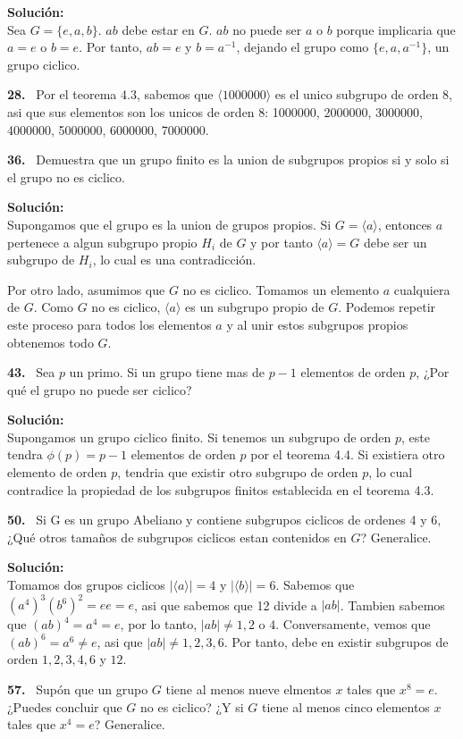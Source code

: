 \documentclass{article}
\newcounter{problem}
\newcounter{solution}
\newcommand\Problem[1]{%
  \stepcounter{problem}%
  \textbf{#1.}~%
  \setcounter{solution}{0}%
}
\newcommand\TheSolution{%
  \textbf{Solución:}\\%
}
\begin{document}
\TheSolution{}
Sea $G = \{e, a, b\}$. $ab$ debe estar en $G$. $ab$ no puede ser $a$ o $b$
porque implicaria que $a = e$ o $b = e$. Por tanto, $ab = e$ y $b = a^{-1}$,
dejando el grupo como $\{e, a, a^{-1}\}$, un grupo ciclico.

\Problem{28} Por el teorema 4.3, sabemos que $\langle 1000000\rangle$ es el
unico subgrupo de orden 8, asi que sus elementos son los unicos de orden 8:
1000000, 2000000, 3000000, 4000000, 5000000, 6000000, 7000000.

\Problem{36} Demuestra que un grupo finito es la union de subgrupos propios si
y solo si el grupo no es ciclico.

\TheSolution{}
Supongamos que el grupo es la union de grupos propios. Si $G = \langle 
a\rangle$, entonces $a$ pertenece a algun subgrupo propio $H_i$ de $G$ y
por tanto $\langle a \rangle = G$ debe ser un subgrupo de $H_i$, lo cual es
una contradicción.

Por otro lado, asumimos que $G$ no es ciclico. Tomamos un elemento $a$
cualquiera de $G$. Como $G$ no es ciclico, $\langle a \rangle$ es un subgrupo
propio de $G$. Podemos repetir este proceso para todos los elementos $a$ y
al unir estos subgrupos propios obtenemos todo $G$.

\Problem{43} Sea $p$ un primo. Si un grupo tiene mas de $p - 1$ elementos de
orden $p$, ¿Por qué el grupo no puede ser ciclico?

\TheSolution{}
Supongamos un grupo ciclico finito. Si tenemos un subgrupo de orden
$p$, este tendra $\phi(p) = p - 1$ elementos de orden $p$ por el teorema 4.4.
Si existiera otro elemento de orden $p$, tendria que existir otro subgrupo de
orden $p$, lo cual contradice la propiedad de los subgrupos finitos 
establecida en el teorema 4.3.

\Problem{50} Si G es un grupo Abeliano y contiene subgrupos ciclicos de
ordenes 4 y 6, ¿Qué otros tamaños de subgrupos ciclicos estan contenidos en
$G$? Generalice.

\TheSolution{} Tomamos dos grupos ciclicos $|\langle a \rangle| = 4$ y 
$|\langle b\rangle| = 6$. Sabemos que ${(a^4)}^{3}{(b^6)}^2 = ee = e$, asi que
sabemos que 12 divide a $|ab|$. Tambien sabemos que ${(ab)}^{4} = a^4 = e$,
por lo tanto, $|ab| \neq 1, 2$ o $4$. Conversamente, vemos que ${(ab)}^{6} =
a^{6} \neq e$, asi que $|ab| \neq 1, 2, 3, 6$. Por tanto, debe en existir
subgrupos de orden $1, 2, 3, 4, 6$ y $12$.

\Problem{57} Supón que un grupo $G$ tiene al menos nueve elmentos $x$ tales
que $x^8 = e$. ¿Puedes concluir que $G$ no es ciclico? ¿Y si $G$ tiene al
menos cinco elementos $x$ tales que $x^4 = e$? Generalice.
\end{document}
